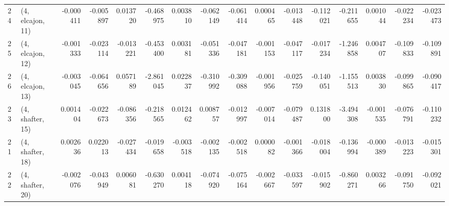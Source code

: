 \begin{tabular}{llrrrrrrrrrrrrrr}
24 &  (4, elcajon, 11) &  -0.000411 & -0.005897 &  0.013720 &  -0.468975 &  0.003810 &  -0.062149 & -0.061414 &  0.000465 & -0.013448 & -0.112021 &  -0.211655 &  0.001044 & -0.022234 & -0.023473 \\
25 &  (4, elcajon, 12) &  -0.001333 & -0.023114 & -0.013221 &  -0.453400 &  0.003181 &  -0.051336 & -0.047181 & -0.001153 & -0.047117 & -0.017234 &  -1.246858 &  0.004707 & -0.109833 & -0.109891 \\
26 &  (4, elcajon, 13) &  -0.003045 & -0.064656 &  0.057189 &  -2.861045 &  0.022837 &  -0.310992 & -0.309088 & -0.001956 & -0.025759 & -0.140051 &  -1.155513 &  0.003830 & -0.099865 & -0.090417 \\
23 &  (4, shafter, 15) &   0.001404 & -0.022673 & -0.086356 &  -0.218565 &  0.012462 &   0.008757 & -0.012997 & -0.007014 & -0.079487 &  0.131800 &  -3.494308 & -0.001535 & -0.076791 & -0.110232 \\
21 &  (4, shafter, 18) &   0.002636 &  0.022013 & -0.027434 &  -0.019658 & -0.003518 &  -0.002135 & -0.002518 &  0.000082 & -0.001366 & -0.018004 &  -0.136994 & -0.000389 & -0.013223 & -0.015301 \\
22 &  (4, shafter, 20) &  -0.002076 & -0.043949 &  0.006081 &  -0.630270 &  0.004118 &  -0.074920 & -0.075164 & -0.002667 & -0.033597 & -0.015902 &  -0.860271 &  0.003266 & -0.091750 & -0.092021 \\
\bottomrule
\end{tabular}
